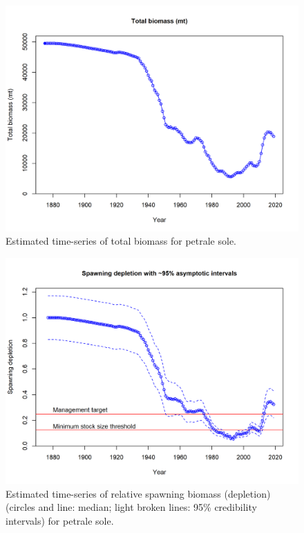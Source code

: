 \documentclass[12pt,]{article}
\begin{document}
\FloatBarrier

\begin{figure}
\centering
\includegraphics{r4ss/plots_mod1/ts1_Total_biomass_(mt).png}
\caption{Estimated time-series of total biomass for petrale sole.
\label{fig:total_bio}}
\end{figure}

\FloatBarrier

\begin{figure}
\centering
\includegraphics{r4ss/plots_mod1/ts9_Spawning_depletion_with_95_asymptotic_intervals_intervals.png}
\caption{Estimated time-series of relative spawning biomass (depletion)
(circles and line: median; light broken lines: 95\% credibility
intervals) for petrale sole. \label{fig:depl}}
\end{figure}
\end{document}
